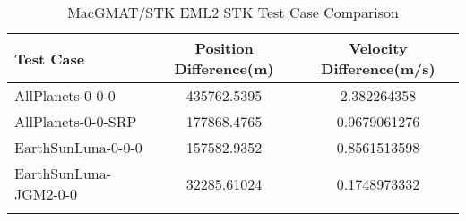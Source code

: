 \begin{table}[htbp!]
\centering
\caption{ MacGMAT/STK EML2 STK Test Case Comparison}
      \begin{tabular}{lcc}
      \hline\hline
          Test Case & Position Difference(m) & Velocity Difference(m/s) \\
         \hline
         AllPlanets-0-0-0 & 435762.5395 & 2.382264358 \\
         AllPlanets-0-0-SRP & 177868.4765 & 0.9679061276 \\
         EarthSunLuna-0-0-0 & 157582.9352 & 0.8561513598 \\
         EarthSunLuna-JGM2-0-0 & 32285.61024 & 0.1748973332 \\
      \hline\hline
      \label{Table: EML2 STK Table} 
\end{tabular}
\end{table}
